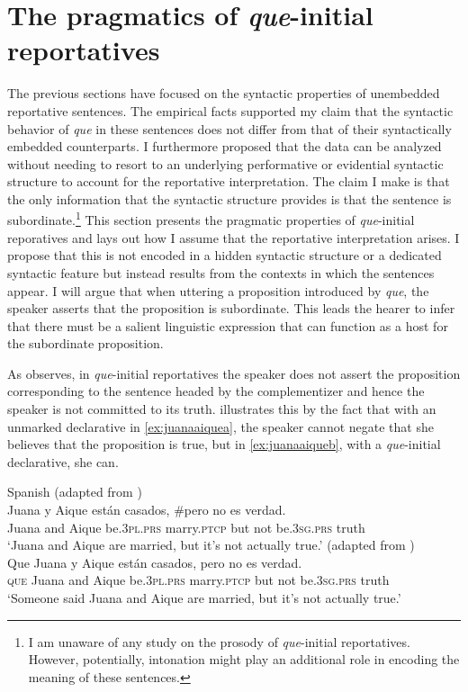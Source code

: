 \section{The pragmatics of \emph{que}-initial reportatives}\label{sec:insubsemprop}

The previous sections have focused on the syntactic properties of unembedded reportative sentences. The empirical facts supported my claim that the syntactic behavior of \emph{que} in these sentences does not differ from that of their syntactically embedded counterparts. I furthermore proposed that the  data can be analyzed without needing to resort to an underlying performative or evidential syntactic structure to account  for the reportative interpretation.  The claim I make is that the only  information that the syntactic structure provides  is that the sentence is subordinate.\footnote{I am unaware of any study on the prosody of \emph{que}-initial reportatives. However, potentially, intonation might play an additional role in encoding the meaning of these sentences.} This section presents the pragmatic properties of \emph{que}-initial reporatives and lays out how I assume that the reportative interpretation arises. I propose that this is not encoded in a hidden syntactic structure or a dedicated syntactic feature but instead results from the contexts in which the sentences appear. 
I will argue that when uttering a proposition introduced by \emph{que}, the speaker asserts that the proposition is subordinate. This leads the hearer to infer that there must be a salient linguistic expression that can function as a host for the subordinate proposition.

 As \citet{Corr2016} observes, in \emph{que}-initial reportatives the speaker does not assert the proposition corresponding to the sentence headed by the complementizer  and hence the speaker is not committed to its truth.  \citeauthor{Corr2016} illustrates this by the fact that  with an unmarked  declarative in \eqref{ex:juanaaiquea}, the speaker cannot negate that she believes that the proposition is true, but in \eqref{ex:juanaaiqueb}, with a \emph{que}-initial declarative, she can.

\ea Spanish
\ea\label{ex:juanaaiquea}
  (adapted from \citealt[158: ex 23]{Corr2016})\\ 
\gll Juana y Aique están casados, \#pero no es verdad. \\
		Juana and Aique be.\textsc{3pl.prs} marry.\textsc{ptcp} but not be.\textsc{3sg.prs} truth\\
		\glt `Juana and Aique are married, but it's not actually true.'
		\ex \label{ex:juanaaiqueb} (adapted from \citealt[158: ex 24]{Corr2016})\\
		\gll Que Juana y Aique están casados, pero no es verdad.  \\
		\textsc{que}	Juana and Aique be.\textsc{3pl.prs} marry.\textsc{ptcp} but not be.\textsc{3sg.prs} truth\\
		\glt `Someone said Juana and Aique are married, but it's not actually true.' 
	\z
\z

